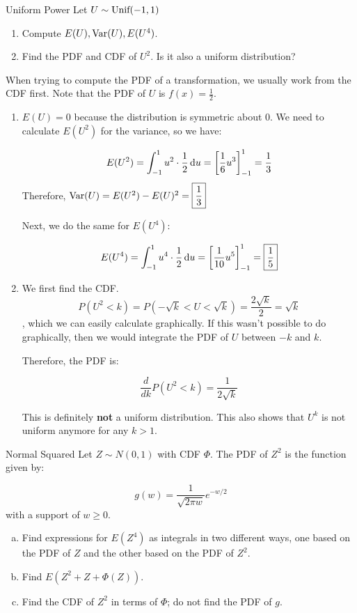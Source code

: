 \documentclass[11.5pt]{article}
\begin{document}
\begin{exercise}{Uniform Power} 
Let $U \sim \textrm{Unif}(-1,1)$
\begin{enumerate}
\item Compute $E(U), \textrm{Var}(U), E(U^4)$. 

\item Find the PDF and CDF of $U^2$. Is it also a uniform distribution? 
\end{enumerate}
\end{exercise}
\begin{solution}{3} 
When trying to compute the PDF of a transformation, we usually work from the CDF first. Note that the PDF of $U$ is $f(x) = \frac{1}{2}$. 
\begin{enumerate}
\item $E(U) = 0$ because the distribution is symmetric about 0. We need to calculate $E(U^2)$ for the variance, so we have:

$$ E(U^2) = \int_{-1}^{1} u^2 \cdot \frac{1}{2} \mathop{}\!\mathrm{d} u = \left[\frac{1}{6} u^3\right]_{-1}^{1} = \frac{1}{3}$$ 
Therefore, $\var\paren{U} = E(U^2) - E(U)^2 = \boxed{\frac{1}{3}}$ 

Next, we do the same for $E(U^4)$: 

$$ E(U^4) = \int_{-1}^{1} u^4 \cdot \frac{1}{2} \mathop{}\!\mathrm{d} u = \left[\frac{1}{10} u^5\right]_{-1}^{1} = \boxed{\frac{1}{5}}$$

\item We first find the CDF. $$P(U^2 < k) = P(-\sqrt{k} < U < \sqrt{k}) = \frac{2\sqrt{k}}{2} = \sqrt{k}$$, which we can easily calculate graphically. If this wasn't possible to do graphically, then we would integrate the PDF of $U$ between $-k$ and $k$. 

Therefore, the PDF is: 

$$ \frac{d}{dk} P(U^2 < k) = \boxed{\frac{1}{2 \sqrt{k}}}$$

This is definitely \textbf{not} a uniform distribution. This also shows that $U^k$ is not uniform anymore for any $k > 1$.
\end{enumerate}
\end{solution}

 \begin{exercise}{Normal Squared}
 Let $Z \sim N(0,1)$ with CDF $\Phi$. The PDF of $Z^2$ is the function given by: 

 $$ g(w) = \frac{1}{\sqrt{2\pi w}} e^{-w/2}$$ with a support of $w \geq 0$. 

 \begin{enumerate}[(a)]
 \item Find expressions for $E(Z^4)$ as integrals in two different ways, one based on the PDF of $Z$ and the other based on the PDF of $Z^2$. 

 \item Find $E(Z^2 + Z + \Phi(Z))$. 

 \item Find the CDF of $Z^2$ in terms of $\Phi$; do not find the PDF of $g$. 
 \end{enumerate}

 \end{exercise}
\end{document}
